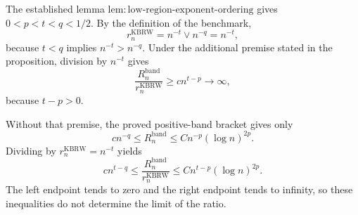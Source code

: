 The established lemma
\(\mathrm{lem:low\mbox{-}region\mbox{-}exponent\mbox{-}ordering}\) gives
\(0<p<t<q<1/2\).  By the definition of the benchmark,
\[
r_n^{\mathrm{KBRW}}=n^{-t}\vee n^{-q}=n^{-t},
\]
because \(t<q\) implies \(n^{-t}>n^{-q}\).  Under the additional premise
stated in the proposition, division by \(n^{-t}\) gives
\[
\frac{R_n^{\mathrm{band}}}{r_n^{\mathrm{KBRW}}}
\ge c n^{t-p}\longrightarrow\infty,
\]
because \(t-p>0\).

Without that premise, the proved positive-band bracket gives only
\[
c n^{-q}\le R_n^{\mathrm{band}}
\le Cn^{-p}(\log n)^{2p}.
\]
Dividing by \(r_n^{\mathrm{KBRW}}=n^{-t}\) yields
\[
c n^{t-q}\le
\frac{R_n^{\mathrm{band}}}{r_n^{\mathrm{KBRW}}}
\le Cn^{t-p}(\log n)^{2p}.
\]
The left endpoint tends to zero and the right endpoint tends to infinity, so
these inequalities do not determine the limit of the ratio.